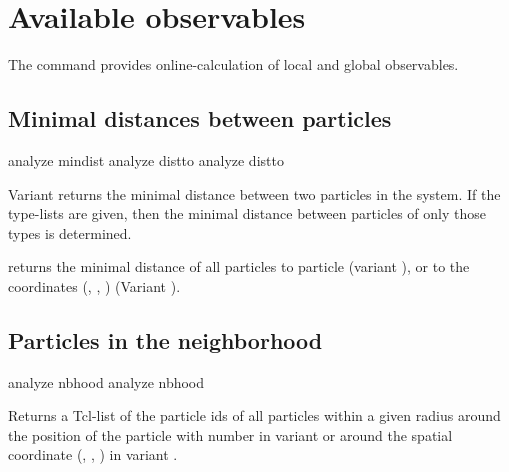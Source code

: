 \section{Available observables}

The command  provides online-calculation of local and
global observables. 

\subsection{Minimal distances between particles}
\label{analyze:mindist}
\label{analyze:distto}

\begin{pysyntax}
\end{pysyntax}
\begin{pysyntax}
\end{pysyntax}
\begin{essyntax}
   analyze mindist 
   analyze distto 
   analyze distto   
\end{essyntax}

Variant  returns the minimal distance between two particles
in the system. If the type-lists are given, then the minimal distance
between particles of only those types is determined.

 returns the minimal distance of all particles to
particle  (variant ), or to the coordinates
(, , ) (Variant ).

\subsection{Particles in the neighborhood}
\label{analyze:nbhood}

\begin{pysyntax}
\end{pysyntax}
\begin{essyntax}
  analyze nbhood  
  analyze nbhood   
\end{essyntax}
Returns a Tcl-list of the particle ids of all particles within a given
radius  around the position of the particle with number
 in variant  or around the spatial coordinate
(, , ) in variant .

